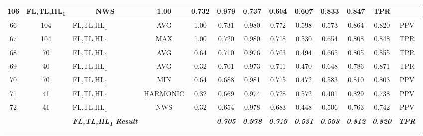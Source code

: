 \begin{table}[H]
{\begin{tabular}{cc|l|cc|c|c|c|c|c|c|c|c|}
    106 &
    FL,TL,HL\textsubscript{1} &
    \multicolumn{1}{c|}{NWS} &
    1.00 &
    0.732 &
    0.979 &
    0.737 &
    0.604 &
    0.607 &
    0.833 &
    0.847 &
    TPR \\ \hline
  \multicolumn{1}{|c|}{66} &
    104 &
    FL,TL,HL\textsubscript{1} &
    \multicolumn{1}{c|}{AVG} &
    1.00 &
    0.731 &
    0.980 &
    0.772 &
    0.598 &
    0.573 &
    0.864 &
    0.820 &
    PPV \\ \hline
  \multicolumn{1}{|c|}{67} &
    104 &
    FL,TL,HL\textsubscript{1} &
    \multicolumn{1}{c|}{MAX} &
    1.00 &
    0.720 &
    0.980 &
    0.718 &
    0.530 &
    0.654 &
    0.808 &
    0.848 &
    TPR \\ \hline
  \multicolumn{1}{|c|}{68} &
    70 &
    FL,TL,HL\textsubscript{1} &
    \multicolumn{1}{c|}{AVG} &
    0.64 &
    0.710 &
    0.976 &
    0.703 &
    0.494 &
    0.665 &
    0.805 &
    0.855 &
    TPR \\ \hline
  \multicolumn{1}{|c|}{69} &
    40 &
    FL,TL,HL\textsubscript{1} &
    \multicolumn{1}{c|}{AVG} &
    0.32 &
    0.701 &
    0.973 &
    0.711 &
    0.470 &
    0.648 &
    0.786 &
    0.871 &
    TPR \\ \hline
  \multicolumn{1}{|c|}{70} &
    70 &
    FL,TL,HL\textsubscript{1} &
    \multicolumn{1}{c|}{MIN} &
    0.64 &
    0.688 &
    0.981 &
    0.715 &
    0.472 &
    0.583 &
    0.810 &
    0.803 &
    PPV \\ \hline
  \multicolumn{1}{|c|}{71} &
    41 &
    FL,TL,HL\textsubscript{1} &
    \multicolumn{1}{c|}{HARMONIC} &
    0.32 &
    0.669 &
    0.974 &
    0.728 &
    0.572 &
    0.401 &
    0.829 &
    0.738 &
    PPV \\ \hline
  \multicolumn{1}{|c|}{72} &
    41 &
    FL,TL,HL\textsubscript{1} &
    \multicolumn{1}{c|}{NWS} &
    0.32 &
    0.654 &
    0.978 &
    0.683 &
    0.448 &
    0.506 &
    0.763 &
    0.742 &
    PPV \\ \hline
   &
    \textit{\textbf{}} &
    \textit{\textbf{FL,TL,HL\textsubscript{1} Result}} &
     &
     &
    \textit{\textbf{0.705}} &
    \textit{\textbf{0.978}} &
    \textit{\textbf{0.719}} &
    \textit{\textbf{0.531}} &
    \textit{\textbf{0.593}} &
    \textit{\textbf{0.812}} &
    \textit{\textbf{0.820}} &
    \textit{\textbf{TPR}} \\ \cline{3-3} \cline{6-13} 
   &
    \textit{\textbf{}} &
    \cellcolor[HTML]{000000}{\color[HTML]{FFFFFF} \textit{\textbf{Grand Average}}} &
     &
     &
    \cellcolor[HTML]{000000}{\color[HTML]{FFFFFF} \textit{\textbf{0.699}}} &

\end{tabular}}
\end{table}

